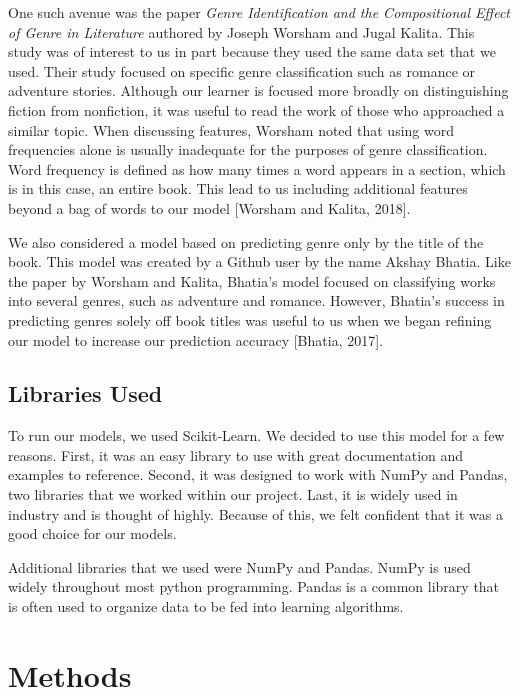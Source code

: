 \documentclass{article}
\begin{document}
One such avenue was the paper \textit{Genre Identification and the Compositional Effect of Genre in Literature} authored by Joseph Worsham and Jugal Kalita. This study was of interest to us in part because they used the same data set that we used. Their study focused on specific genre classification such as romance or adventure stories. Although our learner is focused more broadly on distinguishing fiction from nonfiction, it was useful to read the work of those who approached a similar topic. When discussing features, Worsham noted that using word frequencies alone is usually inadequate for the purposes of genre classification. Word frequency is defined as how many times a word appears in a section, which is in this case, an entire book. This lead to us including additional features beyond a bag of words to our model [Worsham and Kalita, 2018]. \par
We also considered a model based on predicting genre only by the title of the book. This model was created by a Github user by the name Akshay Bhatia. Like the paper by Worsham and Kalita, Bhatia’s model focused on classifying works into several genres, such as adventure and romance. However, Bhatia’s success in predicting genres solely off book titles was useful to us when we began refining our model to increase our prediction accuracy [Bhatia, 2017].


\subsection{Libraries Used}

To run our models, we used Scikit-Learn. We decided to use this model for a few reasons. First, it was an easy library to use with great documentation and examples to reference. Second, it was designed to work with NumPy and Pandas, two libraries that we worked within our project. Last, it is widely used in industry and is thought of highly. Because of this, we felt confident that it was a good choice for our models. \par
Additional libraries that we used were NumPy and Pandas. NumPy is used widely throughout most python programming. Pandas is a common library that is often used to organize data to be fed into learning algorithms. 




\section{Methods}
\end{document}
